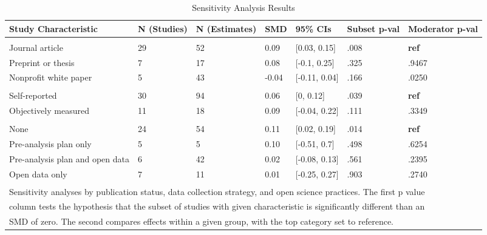 \documentclass[sn-nature,referee,pdflatex]{sn-jnl}
\begin{document}
\begin{table}[!h]
\centering
\caption{\label{tab:table_three}Sensitivity Analysis Results}
\centering
\begin{tabular}[t]{lllllll}
\toprule
Study Characteristic & N (Studies) & N (Estimates) & SMD & 95\% CIs & Subset p-val & Moderator p-val\\
\midrule
\addlinespace[0.3em]
\multicolumn{7}{l}{\textbf{Publication Status}}\\
\hspace{1em}Journal article & 29 & 52 & 0.09 & {}[0.03, 0.15] & .008 & \textbf{ref}\\
\hspace{1em}Preprint or thesis & 7 & 17 & 0.08 & {}[-0.1, 0.25] & .325 & .9467\\
\hspace{1em}Nonprofit white paper & 5 & 43 & -0.04 & {}[-0.11, 0.04] & .166 & .0250\\
\addlinespace[0.3em]
\multicolumn{7}{l}{\textbf{Data Collection Strategy}}\\
\hspace{1em}Self-reported & 30 & 94 & 0.06 & {}[0, 0.12] & .039 & \textbf{ref}\\
\hspace{1em}Objectively measured & 11 & 18 & 0.09 & {}[-0.04, 0.22] & .111 & .3349\\
\addlinespace[0.3em]
\multicolumn{7}{l}{\textbf{Open Science}}\\
\hspace{1em}None & 24 & 54 & 0.11 & {}[0.02, 0.19] & .014 & \textbf{ref}\\
\hspace{1em}Pre-analysis plan only & 5 & 5 & 0.10 & {}[-0.51, 0.7] & .498 & .6254\\
\hspace{1em}Pre-analysis plan and open data & 6 & 42 & 0.02 & {}[-0.08, 0.13] & .561 & .2395\\
\hspace{1em}Open data only & 7 & 11 & 0.01 & {}[-0.25, 0.27] & .903 & .2740\\
\bottomrule
\multicolumn{7}{l}{\textsuperscript{} Sensitivity analyses by publication status, data collection strategy, and open science practices. The first p value}\\
\multicolumn{7}{l}{column tests the hypothesis that the subset of studies with given characteristic is significantly different than an}\\
\multicolumn{7}{l}{SMD of zero. The second compares effects within a given group, with the top category set to reference.}\\
\end{tabular}
\end{table}
\end{document}
